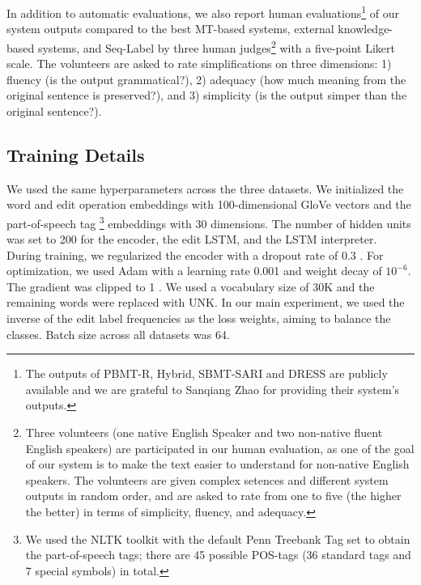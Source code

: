 \documentclass[11pt,a4paper]{article}
\def\seqlabels{Seq-Label }
\begin{document}
In addition to automatic evaluations, we also report human evaluations\footnote{The outputs of PBMT-R, Hybrid, SBMT-SARI and DRESS are publicly available and we are grateful to Sanqiang Zhao for providing their system's outputs.} of our system outputs compared to the best MT-based systems, external knowledge-based systems, and \seqlabels by three human judges\footnote{Three volunteers (one native English Speaker and two non-native fluent English speakers) are participated in our human evaluation, as one of the goal of our system is to make the text easier to understand for non-native English speakers. The volunteers are given complex setences and different system outputs in random order, and are asked to rate from one to five (the higher the better) in terms of simplicity, fluency, and adequacy.} with a five-point Likert scale. The volunteers are asked to rate simplifications on three dimensions: 1) fluency (is the output grammatical?), 2) adequacy (how much meaning from the original sentence is preserved?), and 3) simplicity (is the output simper than the original sentence?).

\subsection{Training Details}
We used the same hyperparameters across the three datasets. We initialized the word and edit operation embeddings with
100-dimensional GloVe vectors \citep{pennington2014glove} and the part-of-speech tag \footnote{We used the NLTK toolkit with the default Penn Treebank Tag set to obtain the part-of-speech tags; there are 45 possible POS-tags (36 standard tags and 7 special symbols) in total.} embeddings with 30 dimensions. The number of hidden units was set to 200 for the encoder, the edit LSTM, and the LSTM interpreter. During
training, we regularized the encoder with a dropout rate of 0.3 \citep{srivastava2014dropout}. For optimization, we used Adam \citep{kingma2014adam} with a learning rate 0.001 and weight decay of $10^{-6}$. The gradient was clipped to 1 \citep{pascanu2013difficulty}. We used a vocabulary size of 30K and the remaining words were replaced with UNK. In our main experiment, we used the inverse of the edit label frequencies as the loss weights, aiming to balance the classes. 
Batch size across all datasets was 64. 
\end{document}

